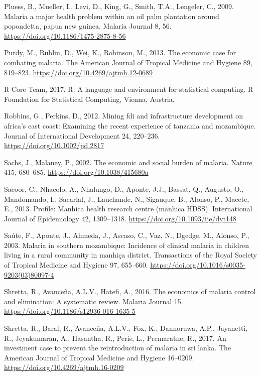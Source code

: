 \documentclass[]{article}
\begin{document}
\hypertarget{ref-Pluess2009}{}
Pluess, B., Mueller, I., Levi, D., King, G., Smith, T.A., Lengeler, C.,
2009. Malaria a major health problem within an oil palm plantation
around popondetta, papua new guinea. Malaria Journal 8, 56.
\url{https://doi.org/10.1186/1475-2875-8-56}

\hypertarget{ref-Purdy_2013}{}
Purdy, M., Rublin, D., Wei, K., Robinson, M., 2013. The economic case
for combating malaria. The American Journal of Tropical Medicine and
Hygiene 89, 819--823. \url{https://doi.org/10.4269/ajtmh.12-0689}

\hypertarget{ref-R}{}
R Core Team, 2017. R: A language and environment for statistical
computing. R Foundation for Statistical Computing, Vienna, Austria.

\hypertarget{ref-Robbins2012}{}
Robbins, G., Perkins, D., 2012. Mining fdi and infrastructure
development on africa's east coast: Examining the recent experience of
tanzania and mozambique. Journal of International Development 24,
220--236. \url{https://doi.org/10.1002/jid.2817}

\hypertarget{ref-Sachs2002}{}
Sachs, J., Malaney, P., 2002. The economic and social burden of malaria.
Nature 415, 680--685. \url{https://doi.org/10.1038/415680a}

\hypertarget{ref-Sacoor2013}{}
Sacoor, C., Nhacolo, A., Nhalungo, D., Aponte, J.J., Bassat, Q.,
Augusto, O., Mandomando, I., Sacarlal, J., Lauchande, N., Sigauque, B.,
Alonso, P., Macete, E., 2013. Profile: Manhica health research centre
(manhica HDSS). International Journal of Epidemiology 42, 1309--1318.
\url{https://doi.org/10.1093/ije/dyt148}

\hypertarget{ref-Sate2003}{}
Saúte, F., Aponte, J., Ahmeda, J., Ascaso, C., Vaz, N., Dgedge, M.,
Alonso, P., 2003. Malaria in southern mozambique: Incidence of clinical
malaria in children living in a rural community in manhiça district.
Transactions of the Royal Society of Tropical Medicine and Hygiene 97,
655--660. \url{https://doi.org/10.1016/s0035-9203(03)80097-4}

\hypertarget{ref-Shretta2016}{}
Shretta, R., Avanceña, A.L.V., Hatefi, A., 2016. The economics of
malaria control and elimination: A systematic review. Malaria Journal
15. \url{https://doi.org/10.1186/s12936-016-1635-5}

\hypertarget{ref-Shretta_2017}{}
Shretta, R., Baral, R., Avanceña, A.L.V., Fox, K., Dannoruwa, A.P.,
Jayanetti, R., Jeyakumaran, A., Hasantha, R., Peris, L., Premaratne, R.,
2017. An investment case to prevent the reintroduction of malaria in sri
lanka. The American Journal of Tropical Medicine and Hygiene 16--0209.
\url{https://doi.org/10.4269/ajtmh.16-0209}
\end{document}

